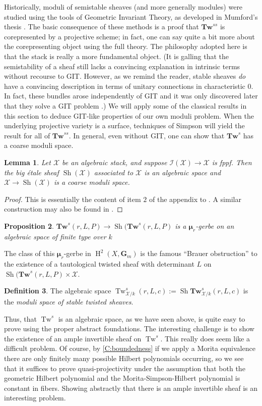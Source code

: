 \documentclass[11pt]{amsart}
\newcommand{\field}[1]{\mathbf #1}
\newcommand{\ms}[1]{\mathscr #1}
\DeclareMathOperator{\sh}{Sh}
\newcommand{\m}{\boldsymbol{\mu}}
\newcommand{\G}{\field G} %
\renewcommand{\H}{\operatorname{H}}
\renewcommand{\[}{[\!\hspace{0.03em}[}
\renewcommand{\]}{]\!\hspace{0.03em}]}
\renewcommand{\(}{(\!\hspace{0.03em}(}
\renewcommand{\)}{)\!\hspace{0.03em})}
\newcommand{\Tw}{\mathbf{Tw}}
\DeclareMathOperator{\mTw}{Tw}
\newtheorem{lem}{Lemma}[subsubsection]%
\newtheorem{prop}[lem]{Proposition}
\theoremstyle{definition}
\newtheorem{defn}[lem]{Definition}
\theoremstyle{remark}
\begin{document}
Historically, moduli of semistable sheaves (and more generally modules) 
were studied using the tools of Geometric Invariant Theory, as 
developed in Mumford's thesis \cite{git}.  The basic consequence of these methods 
is a proof that $\Tw^{ss}$ is corepresented by a projective scheme; in 
fact, one can say quite a bit more about the corepresenting object 
using the full theory.  The philosophy adopted here is that 
the stack is really a more fundamental object.  (It is galling that 
the semistability of a sheaf still lacks a convincing explanation in 
intrinsic terms without recourse to GIT.  However, as we remind the 
reader, stable sheaves \emph{do\/} have a convincing description in 
terms of unitary connections in characteristic 0.  In fact, 
these bundles arose independently of GIT and it was only discovered 
later that they solve a GIT problem \cite{raynaud}.)  We will apply some of the 
classical results in this section to deduce GIT-like properties of our 
own moduli problem.  When the underlying projective variety is a 
surface, techniques of Simpson will yield the result for all of 
$\Tw^{ss}$.  In general, even without GIT, one can show that 
$\Tw^{s}$ has a coarse moduli space.

\begin{lem}\label{L:make coarse space} Let $\ms X$ be an algebraic stack, and suppose $\ms I(\ms 
X)\to\ms X$ is fppf.  Then the big \'etale sheaf $\sh(\ms X)$ associated to $\ms X$ is an 
algebraic space and $\ms X\to\sh(\ms X)$ is a coarse moduli space.
\end{lem}
\begin{proof} This is essentially the 
content of item $2$ of the appendix to \cite{artin}.  A similar 
construction may also be found in \cite{abramovich-corti-vistoli}.  
\end{proof}

\begin{prop} $\Tw^{s}(r,L,P)\to\sh(\Tw^{s}(r,L,P)$ is a $\m_{r}$-gerbe on an 
algebraic space of finite type over $k$
\end{prop}
The class of this $\m_{r}$-gerbe 
in $\H^{2}(X,\G_{m})$ is the famous ``Brauer obstruction'' to the 
existence of a tautological twisted sheaf with determinant $L$ on $\sh(\Tw^{s}(r,L,P)\times\ms X$.  

\begin{defn} The algebraic space $\mTw^{s}_{\ms 
X/k}(r,L,c):=\sh\Tw^{s}_{\ms X/k}(r,L,c)$ is the \emph{moduli space 
of stable twisted sheaves\/}.
\end{defn}
Thus, that $\mTw^{s}$ is an algebraic space, as we have seen above, is 
quite easy to prove using the proper abstract foundations.  
The interesting challenge is to show the existence of an 
ample invertible sheaf on $\mTw^{s}$.  This really does seem like a 
difficult problem.  Of course, by \ref{C:boundedness} if we apply a 
Morita equivalence there are only finitely many possible Hilbert 
polynomials occurring, so we see that it suffices to prove 
quasi-projectivity under the assumption that both the geometric 
Hilbert polynomial and the Morita-Simpson-Hilbert polynomial is 
constant in fibers.  Showing 
abstractly that there is an ample invertible sheaf is an interesting 
problem.  
\end{document}
